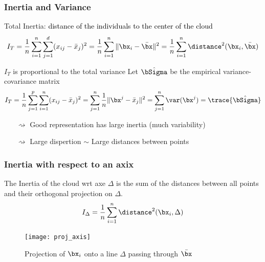 \documentclass{beamer}\usepackage[]{graphicx}\usepackage[]{color}
\begin{document}
\begin{frame}
  \frametitle{Inertia and Variance}

\begin{block}{Total Inertia: \textcolor{black}{distance of the individuals to the center of the cloud}}
  \[
      I_T = \frac{1}{n}\sum_{i=1}^n \sum_{j=1}^d  (x_{ij}- \bar{x}_{j}) ^2 
      = \frac{1}{n}\sum_{i=1}^n \|\bx_i - \bar{\bx} \|^2  
      = \frac{1}{n}\sum_{i=1}^n \distance^2 (\bx_i,\bar{\bx})
    \]
\end{block}

  \begin{block}{$I_T$ is proportional to the total variance}
  Let $\hat{\bSigma}$ be the empirical variance-covariance matrix
\[
      I_T = \frac{1}{n}\sum_{j=1}^p  \sum_{i=1}^n (x_{ij}- \bar{x}_{j}) ^2 
      = \sum_{j=1}^n \frac{1}{n}\|\bx^j - \bar{x}_{j} \|^2
      = \sum_{j=1}^n \var(\bx^j) = \trace{\hat{\bSigma}}
\]
\end{block}

\begin{itemize}
  \item[$\rightsquigarrow$] \alert{Good representation has large inertia} (much variability)
  \item[$\rightsquigarrow$] \alert{Large dispertion $\sim$ Large distances between points}
\end{itemize}
  
\end{frame}

\begin{frame}
  \frametitle{Inertia with respect to an axix}

  The Inertia of the cloud wrt axe $\Delta$ is the sum of the distances between all points and their orthogonal projection on $\Delta$.
  \begin{equation*}
    \begin{aligned}
      I_\Delta = \frac{1}{n}\sum_{i=1}^n \distance^2(\bx_i, \Delta)
      \end{aligned}
  \end{equation*}

  \begin{figure}
    \texttt{[image: proj\_axis]}
    \caption{Projection of $\bx_i$ onto a line $\Delta$ passing through $\bar\bx$}
  \end{figure}

\end{frame}
\end{document}
